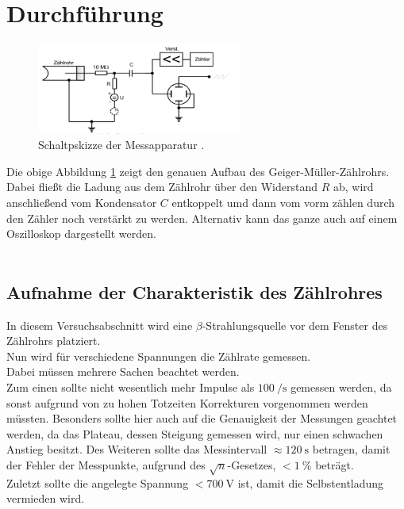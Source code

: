 \newpage
\section{Durchführung}

\begin{figure}[H]
    \centering
    \includegraphics[width=0.6\textwidth]{images/schaltplan.PNG}
    \caption{Schaltpskizze der Messapparatur \protect \cite{V703}.}
    \label{img:schalt}
\end{figure}
Die obige Abbildung \ref{img:schalt} zeigt den genauen Aufbau des Geiger-Müller-Zählrohrs. Dabei fließt die Ladung aus dem Zählrohr über den Widerstand $R$ ab, 
wird anschließend vom Kondensator $C$ entkoppelt umd dann vom vorm zählen durch den Zähler noch verstärkt zu werden. Alternativ kann das ganze auch auf einem Oszilloskop dargestellt werden.\\\\

\subsection{Aufnahme der Charakteristik des Zählrohres}

\noindent
In diesem Versuchsabschnitt wird eine $\beta$-Strahlungsquelle vor dem Fenster des Zählrohrs platziert.\\
Nun wird für verschiedene Spannungen die Zählrate gemessen.\\
Dabei müssen mehrere Sachen beachtet werden.\\
Zum einen sollte nicht wesentlich mehr Impulse als $\SI{100}{\per\second}$ gemessen werden, da sonst aufgrund von zu hohen Totzeiten Korrekturen vorgenommen werden müssten.
Besonders sollte hier auch auf die Genauigkeit der Messungen geachtet werden, da das Plateau, dessen Steigung gemessen wird, nur einen schwachen Anstieg besitzt.
Des Weiteren sollte das Messintervall $\approx\SI{120}{\second}$ betragen, damit der Fehler der Messpunkte, aufgrund des $\sqrt{n}$-Gesetzes, $<\SI{1}{\percent}$ beträgt.\\
Zuletzt sollte die angelegte Spannung $<\SI{700}{\volt}$ ist, damit die Selbstentladung vermieden wird.\\\\

